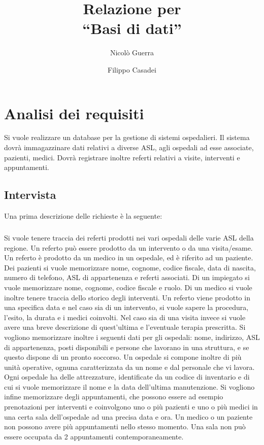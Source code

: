 \documentclass[a4paper,12pt]{report}
\title{Relazione per\\``Basi di dati''}
\author{Nicolò Guerra \and
Filippo Casadei}
\begin{document}
\maketitle

\tableofcontents

\chapter{Analisi dei requisiti}

Si vuole realizzare un database per la gestione di sistemi ospedalieri. Il sistema dovrà immagazzinare dati relativi a diverse ASL,
agli ospedali ad esse associate, pazienti, medici. Dovrà registrare inoltre referti relativi a visite, interventi e appuntamenti.

\section{Intervista}
Una prima descrizione delle richieste è la seguente:
\paragraph{}
Si vuole tenere traccia dei referti prodotti nei vari ospedali delle varie ASL della regione. Un referto può essere prodotto da un
intervento o da una visita/esame. Un referto è prodotto da un medico in un ospedale, ed è riferito ad un paziente. Dei pazienti si
vuole memorizzare nome, cognome, codice fiscale, data di nascita, numero di telefono, ASL di appartenenza e referti associati.
Di un impiegato si vuole memorizzare nome, cognome, codice fiscale e ruolo. Di un medico si vuole inoltre tenere traccia dello
storico degli interventi.
Un referto viene prodotto in una specifica data e nel caso sia di un intervento, si vuole sapere la procedura, l'esito, la durata e i medici
coinvolti. Nel caso sia di una visita invece si vuole avere una breve descrizione di quest'ultima e l'eventuale terapia prescritta.
Si vogliono memorizzare inoltre i seguenti dati per gli ospedali: nome, indirizzo, ASL di appartenenza, posti disponibili e persone
che lavorano in una struttura, e se questo dispone di un pronto soccorso.
Un ospedale si compone inoltre di più unità operative, ognuna caratterizzata da un nome e dal personale che vi lavora.
Ogni ospedale ha delle attrezzature, identificate da un codice di inventario e di cui si vuole memorizzare il nome e la data dell'ultima
manutenzione.
Si vogliono infine memorizzare degli appuntamenti, che possono essere ad esempio prenotazioni per interventi e coinvolgono uno o più
pazienti e uno o più medici in una certa sala dell'ospedale ad una precisa data e ora. Un medico o un paziente non possono avere più
appuntamenti nello stesso momento. Una sala non può essere occupata da 2 appuntamenti contemporaneamente.
\end{document}

